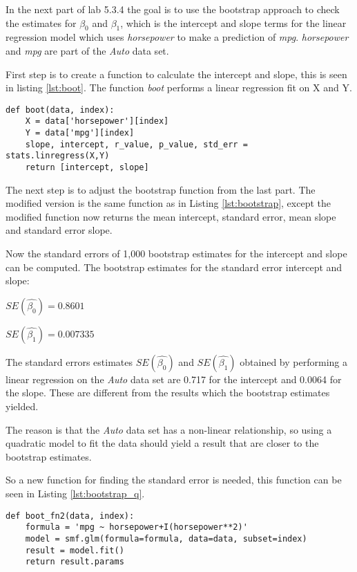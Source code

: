 In the next part of lab 5.3.4 the goal is to use the bootstrap approach to check the estimates for $\beta_0$ and $\beta_1$, which is the intercept and slope terms for the linear regression model which uses \emph{horsepower} to make a prediction of \emph{mpg}. \emph{horsepower} and \emph{mpg} are part of the \emph{Auto} data set.

First step is to create a function to calculate the intercept and slope, this is seen in listing \ref{lst:boot}. The function \emph{boot} performs a linear regression fit on X and Y. 

\begin{lstlisting}[caption={Boot function in python}, label=lst:boot, mathescape=true]
def boot(data, index):
	X = data['horsepower'][index]
	Y = data['mpg'][index]
	slope, intercept, r_value, p_value, std_err = stats.linregress(X,Y)
	return [intercept, slope]
\end{lstlisting}

The next step is to adjust the bootstrap function from the last part. The modified version is the same function as in Listing \ref{lst:bootstrap}, except the modified function now returns the mean intercept, standard error, mean slope and standard error slope.

Now the standard errors of 1,000 bootstrap estimates for the intercept and slope can be computed.
The bootstrap estimates for the standard error intercept and slope:

\begin{center}
	$SE(\hat{\beta_0}) = 0.8601$
\end{center} 
\begin{center}
	$SE(\hat{\beta_1}) = 0.007335$
\end{center}

The standard errors estimates $SE(\hat{\beta_0})$ and $SE(\hat{\beta_1})$ obtained by performing a linear regression on the \emph{Auto} data set are 0.717 for the intercept and 0.0064 for the slope. These are different from the results which the bootstrap estimates yielded.

The reason is that the \emph{Auto} data set has a non-linear relationship, so using a quadratic model to fit the data should yield a result that are closer to the bootstrap estimates.

So a new function for finding the standard error is needed, this function can be seen in Listing \ref{lst:bootstrap_q}.

\begin{lstlisting}[caption={Function to calculate standard error with a qudratic model}, label=lst:bootstrap_q, mathescape=true]
def boot_fn2(data, index):
	formula = 'mpg ~ horsepower+I(horsepower**2)'
	model = smf.glm(formula=formula, data=data, subset=index)
	result = model.fit()
	return result.params
\end{lstlisting}

